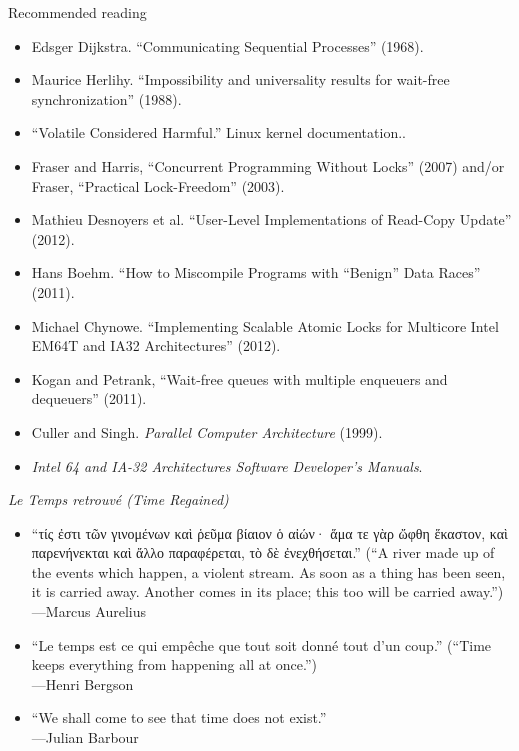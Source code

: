 \documentclass[mathserif,xcolor={dvipsnames,table}]{beamer}
\begin{document}
\begin{frame}{Recommended reading}
\small{
\begin{itemize}
\item Edsger Dijkstra. ``Communicating Sequential Processes'' (1968).
\item Maurice Herlihy. ``Impossibility and universality results for wait-free synchronization'' (1988).
\item ``Volatile Considered Harmful.'' Linux kernel documentation..
\item Fraser and Harris, ``Concurrent Programming Without Locks'' (2007) and/or Fraser,
	``Practical Lock-Freedom'' (2003).
\item Mathieu Desnoyers et al. ``User-Level Implementations of Read-Copy Update'' (2012).
\item Hans Boehm. ``How to Miscompile Programs with ``Benign'' Data Races'' (2011).
\item Michael Chynowe. ``Implementing Scalable Atomic Locks for Multicore Intel EM64T and IA32 Architectures'' (2012).
\item Kogan and Petrank, ``Wait-free queues with multiple enqueuers and dequeuers'' (2011).
\item Culler and Singh. \textit{Parallel Computer Architecture} (1999). 
\item \textit{Intel 64 and IA-32 Architectures Software Developer's Manuals}.
\end{itemize}
}
\end{frame}

\begin{frame}{\textit{Le Temps retrouvé (Time Regained)}}
\begin{itemize}
\item `` τίς ἐστι τῶν γινομένων καὶ ῥεῦμα βίαιον ὁ αἰών· ἅμα
τε γὰρ ὤφθη ἕκαστον, καὶ παρενήνεκται καὶ ἄλλο παραφέρεται, τὸ δὲ
ἐνεχθήσεται.\latintext'' (``A river made up of the events which
happen, a violent stream. As soon as a thing has been seen, it is
carried away. Another comes in its place; this too will be carried away.'')\\ \hfill---Marcus Aurelius
\vspace{.1in}
\item {}``Le temps est ce qui empêche que tout soit donné tout d'un coup.'' \latintext (``Time
	keeps everything from happening all at once.'')\\ \hfill---Henri Bergson
\vspace{.1in}
\item ``We shall come to see that time does not exist.''\\ \hfill---Julian Barbour
\end{itemize}
\end{frame}
\end{document}
